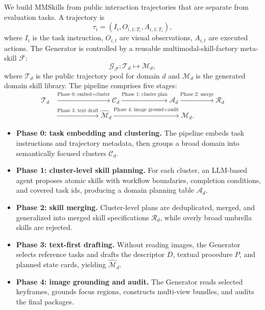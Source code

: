 We build MMSkills from public interaction trajectories that are separate from evaluation tasks. A trajectory is
\begin{equation}
    \tau_i=(I_i,O_{i,1:T_i},A_{i,1:T_i}),
\end{equation}
where $I_i$ is the task instruction, $O_{i,t}$ are visual observations, $A_{i,t}$ are executed actions. The Generator is controlled by a reusable multimodal-skill-factory meta-skill $\mathcal{F}$:
\begin{equation}
    \mathcal{G}_{\mathcal{F}}:\mathcal{T}_d\mapsto\mathcal{M}_d,
    \label{eq:meta-generator}
\end{equation}
where $\mathcal{T}_d$ is the public trajectory pool for domain $d$ and $\mathcal{M}_d$ is the generated domain skill library. The pipeline comprises five stages:
\begin{equation}
\begin{aligned}
    \mathcal{T}_d
    &\xrightarrow{\text{Phase 0: embed+cluster}} \mathcal{C}_d
    \xrightarrow{\text{Phase 1: cluster plan}} \mathcal{A}_d
    \xrightarrow{\text{Phase 2: merge}} \mathcal{R}_d \\
    &\xrightarrow{\text{Phase 3: text draft}} \widehat{\mathcal{M}}_d
    \xrightarrow{\text{Phase 4: image ground+audit}} \mathcal{M}_d .
\end{aligned}
\label{eq:generator-pipeline}
\end{equation}

\begin{itemize}[leftmargin=*]
    \item \textbf{Phase 0: task embedding and clustering.} The pipeline embeds task instructions and trajectory metadata, then groups a broad domain into semantically focused clusters $\mathcal{C}_d$.
    \item \textbf{Phase 1: cluster-level skill planning.} For each cluster, an LLM-based agent proposes atomic skills with workflow boundaries, completion conditions, and covered task ids, producing a domain planning table $\mathcal{A}_d$.
    \item \textbf{Phase 2: skill merging.} Cluster-level plans are deduplicated, merged, and generalized into merged skill specifications $\mathcal{R}_d$, while overly broad umbrella skills are rejected.
    \item \textbf{Phase 3: text-first drafting.} Without reading images, the Generator selects reference tasks and drafts the descriptor $D$, textual procedure $P$, and planned state cards, yielding $\widehat{\mathcal{M}}_d$.
    \item \textbf{Phase 4: image grounding and audit.} The Generator reads selected keyframes, grounds focus regions, constructs multi-view bundles, and audits the final packages.
\end{itemize}

